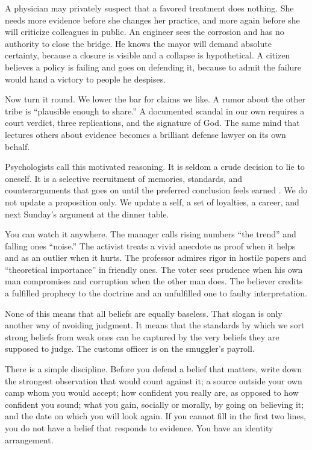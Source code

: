 \documentclass[12pt,a4paper]{book}
\begin{document}
A physician may privately suspect that a favored treatment does nothing. She needs more evidence before she changes her practice, and more again before she will criticize colleagues in public. An engineer sees the corrosion and has no authority to close the bridge. He knows the mayor will demand absolute certainty, because a closure is visible and a collapse is hypothetical. A citizen believes a policy is failing and goes on defending it, because to admit the failure would hand a victory to people he despises.

Now turn it round. We lower the bar for claims we like. A rumor about the other tribe is ``plausible enough to share.'' A documented scandal in our own requires a court verdict, three replications, and the signature of God. The same mind that lectures others about evidence becomes a brilliant defense lawyer on its own behalf.

Psychologists call this motivated reasoning. It is seldom a crude decision to lie to oneself. It is a selective recruitment of memories, standards, and counterarguments that goes on until the preferred conclusion feels earned \cite{Kunda1990}. We do not update a proposition only. We update a self, a set of loyalties, a career, and next Sunday's argument at the dinner table.

You can watch it anywhere. The manager calls rising numbers ``the trend'' and falling ones ``noise.'' The activist treats a vivid anecdote as proof when it helps and as an outlier when it hurts. The professor admires rigor in hostile papers and ``theoretical importance'' in friendly ones. The voter sees prudence when his own man compromises and corruption when the other man does. The believer credits a fulfilled prophecy to the doctrine and an unfulfilled one to faulty interpretation.

None of this means that all beliefs are equally baseless. That slogan is only another way of avoiding judgment. It means that the standards by which we sort strong beliefs from weak ones can be captured by the very beliefs they are supposed to judge. The customs officer is on the smuggler's payroll.

There is a simple discipline. Before you defend a belief that matters, write down the strongest observation that would count against it; a source outside your own camp whom you would accept; how confident you really are, as opposed to how confident you sound; what you gain, socially or morally, by going on believing it; and the date on which you will look again. If you cannot fill in the first two lines, you do not have a belief that responds to evidence. You have an identity arrangement.
\end{document}
